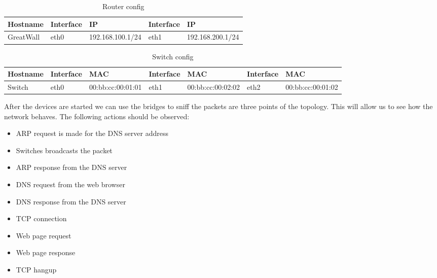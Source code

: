 \begin{center}
  \begin{table}[htb]
  \begin{center}
  \begin{tabular}{| l | l | l | l | l |}
    \hline
      Hostname & Interface & IP & Interface & IP \\ \hline
      GreatWall & eth0 & 192.168.100.1/24 & eth1 & 192.168.200.1/24 \\ 
    \hline
  \end{tabular}
  \end{center}
  \caption{Router config}
  \label{table:complex-router}
  \end{table}
\end{center}

\begin{center}
  \begin{table}[htb]
  \begin{center}
  \begin{tabular}{| l | l | l | l | l | l | l |}
    \hline
      Hostname & Interface & MAC & Interface & MAC & Interface & MAC \\ \hline
      Switch & eth0 & 00:bb:cc:00:01:01 & eth1 & 00:bb:cc:00:02:02 & eth2 & 00:bb:cc:00:01:02 \\
    \hline
  \end{tabular}
  \end{center}
  \caption{Switch config}
  \label{table:complex-switch}
  \end{table}
\end{center}

After the devices are started we can use the bridges to sniff the packets are three points of the topology.
This will allow us to see how the network behaves. The following actions should be observed:
\begin{itemize}
	\item ARP request is made for the DNS server address
	\item Switches broadcasts the packet
	\item ARP response from the DNS server
	\item DNS request from the web browser
	\item DNS response from the DNS server
	\item TCP connection
	\item Web page request
	\item Web page response
	\item TCP hangup
\end{itemize}

